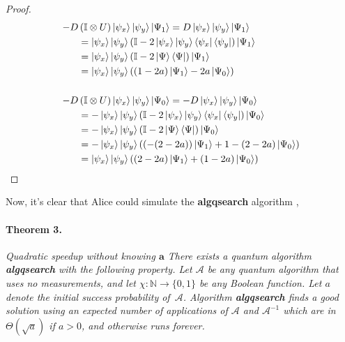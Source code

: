 \documentclass{article}
\begin{document}
\begin{proof}
    \begin{equation*}
      \begin{split}
    - D & \left( \mathbb{I} \otimes U \right)  \ket{\psi_{x}}\ket{\psi_{y}} \ket{\Psi_1} =    D  \ket{\psi_{x}}\ket{\psi_{y}} \ket{\Psi_1} \\
  & = \ket{\psi_{x}}\ket{\psi_{y}} \left( \mathbb{I} - 2 \ket{\psi_{x}}\ket{\psi_{y}} \bra{ \psi_{x}}\bra{\psi_{y}} \right) \ket{\Psi_1} \\
  & =  \ket{\psi_{x}}\ket{\psi_{y}} \left( \mathbb{I} - 2 \ket{\Psi} \bra{\Psi} \right) \ket{\Psi_1}  \\ 
  & = \ket{\psi_{x}}\ket{\psi_{y}} \left( \left( 1 - 2a  \right)\ket{\Psi_1} - 2a \ket{\Psi_0} \right) \\ 
  & \\ 
  - D & \left( \mathbb{I} \otimes U \right)  \ket{\psi_{x}}\ket{\psi_{y}} \ket{\Psi_0} =   - D  \ket{\psi_{x}}\ket{\psi_{y}} \ket{\Psi_0} \\
  & = - \ket{\psi_{x}}\ket{\psi_{y}} \left( \mathbb{I} - 2 \ket{\psi_{x}}\ket{\psi_{y}} \bra{ \psi_{x}}\bra{\psi_{y}} \right) \ket{\Psi_0} \\
  & = - \ket{\psi_{x}}\ket{\psi_{y}} \left( \mathbb{I} - 2 \ket{\Psi} \bra{\Psi} \right) \ket{\Psi_0} \\ 
  & = - \ket{\psi_{x}}\ket{\psi_{y}} \left( \left(  - (2-2a)  \right)\ket{\Psi_1} + 1 -(2 - 2a) \ket{\Psi_0} \right) \\ 
  & = \ket{\psi_{x}}\ket{\psi_{y}} \left( \left( 2-2a \right)\ket{\Psi_1} + \left(1  - 2a\right) \ket{\Psi_0} \right) 
\end{split}
\end{equation*}
\end{proof}
Now, it's clear that Alice could simulate the \textbf{algqsearch} algorithm \cite{Brassard_2002}, 

\paragraph{Theorem 3.} \textit{Quadratic speedup without knowing $\mathbf{a}$
There exists a quantum algorithm \textbf{algqsearch} with the following property.
Let $\mathcal A$ be any quantum algorithm that uses no measurements,
and let $\chi: \mathbb{N}  \rightarrow \{0,1\}$ be any Boolean function.
Let $a$ denote the initial success probability of~$\mathcal A$.
Algorithm \textbf{algqsearch} finds a good solution using an expected number
of applications of $\mathcal A$ and ${\mathcal A}^{-1}$ which are in
$\Theta(\sqrt a)$ if $a>0$, and otherwise runs forever.}
\end{document}
